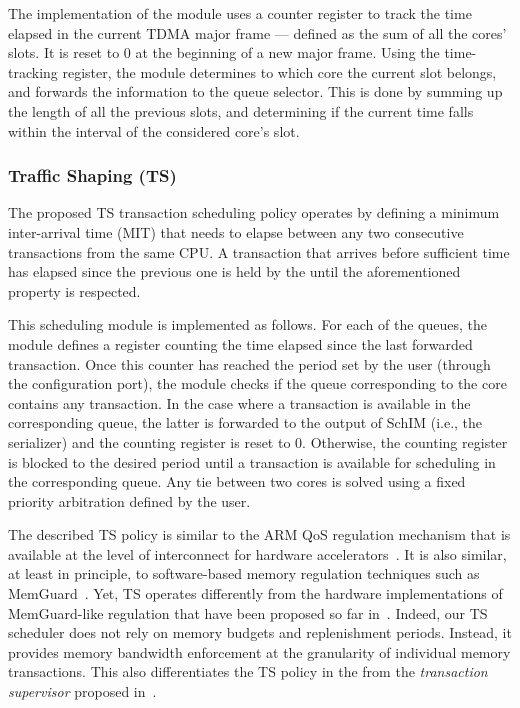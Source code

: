 The implementation of the module uses a counter register to track the
time elapsed in the current TDMA major frame --- defined as the sum of
all the cores' slots. It is reset to 0 at the beginning of a new major
frame. Using the time-tracking register, the module determines to
which core the current slot belongs, and forwards the information to
the queue selector. This is done by summing up the length of all the
previous slots, and determining if the current time falls within the
interval of the considered core's slot.


\subsubsection{Traffic Shaping (TS)}
The proposed TS transaction scheduling policy operates by defining a
minimum inter-arrival time (MIT) that needs to elapse between any two
consecutive transactions from the same CPU. A transaction that arrives
before sufficient time has elapsed since the previous one is held by
the \schim until the aforementioned property is respected.

This scheduling module is implemented as follows. For each of the
\schim queues, the module defines a register counting the time elapsed
since the last forwarded transaction. Once this counter has reached
the period set by the user (through the configuration port), the
module checks if the queue corresponding to the core contains any
transaction. In the case where a transaction is available in the
corresponding queue, the latter is forwarded to the output of SchIM
(i.e., the serializer) and the counting register is reset to
0. Otherwise, the counting register is blocked to the desired period
until a transaction is available for scheduling in the corresponding
queue. Any tie between two cores is solved using a fixed priority
arbitration defined by the user.

The described TS policy is similar to the ARM QoS regulation mechanism
that is available at the level of interconnect for hardware
accelerators~\cite{QoS-301, QoS-400, ewarp_rtss20}. It is also
similar, at least in principle, to software-based memory regulation
techniques such as MemGuard~\cite{memguard}. Yet, TS operates
differently from the hardware implementations of MemGuard-like
regulation that have been proposed so far in~\cite{MITTS,
  Farshchi2020BRUBR}. Indeed, our TS scheduler does not rely on memory
budgets and replenishment periods. Instead, it provides memory
bandwidth enforcement at the granularity of individual memory
transactions. This also differentiates the TS policy in the \schim
from the \emph{transaction supervisor} proposed
in~\cite{hyperconnect_dac20}.

